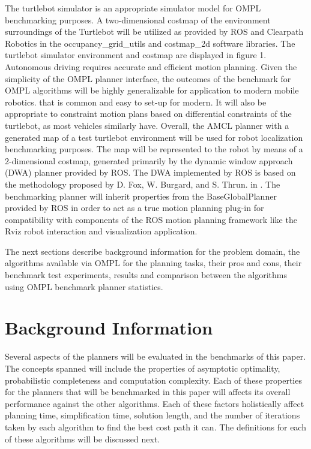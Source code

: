 \documentclass[conference]{IEEEtran} \usepackage[T1]{fontenc} \usepackage[backend=biber, style=ieee]{biblatex}
\begin{document}
The turtlebot simulator is an appropriate simulator model for OMPL benchmarking purposes. A two-dimensional costmap of the environment surroundings of the Turtlebot
will be utilized as provided by ROS and Clearpath Robotics in the occupancy\_grid\_utils and costmap\_2d software libraries. The turtlebot simulator environment and costmap 
are displayed in figure 1. Autonomous driving requires accurate and efficient motion planning. Given the simplicity of the OMPL planner interface, the outcomes of the benchmark
for OMPL algorithms will be highly generalizable for application to modern mobile robotics. that is common and easy to set-up for modern. It will also be appropriate to constraint motion plans based on differential constraints of the turtlebot, as most vehicles similarly have. Overall, the 
AMCL planner with a generated map of a test turtlebot environment will be used for robot localization benchmarking purposes. The map will be represented to the robot by 
means of a 2-dimensional costmap, generated primarily by the dynamic window approach (DWA) planner provided by ROS. The DWA implemented by ROS is based on the 
methodology proposed by D. Fox, W. Burgard, and S. Thrun. in \cite{dwa}. The benchmarking planner will inherit properties from the BaseGlobalPlanner provided by ROS in 
order to act as a true motion planning plug-in for compatibility with components of the ROS motion planning framework like the Rviz robot interaction and visualization 
application.

The next sections describe background information for the problem domain, the algorithms available via OMPL for the planning tasks, their pros and cons, their benchmark 
test experiments, results and comparison between the algorithms using OMPL benchmark planner statistics.

\section{Background Information} \label{Background Information}

Several aspects of the planners will be evaluated in the benchmarks of this paper. The concepts spanned will include the properties of asymptotic optimality, probabilistic 
completeness and computation complexity. Each of these properties for the planners that will be benchmarked in this paper will affects its overall performance against
the other algorithms. Each of these factors holistically affect planning time, simplification time, solution length, and the number of iterations
taken by each algorithm to find the best cost path it can. The definitions for each of these algorithms will be discussed next.
\end{document}
